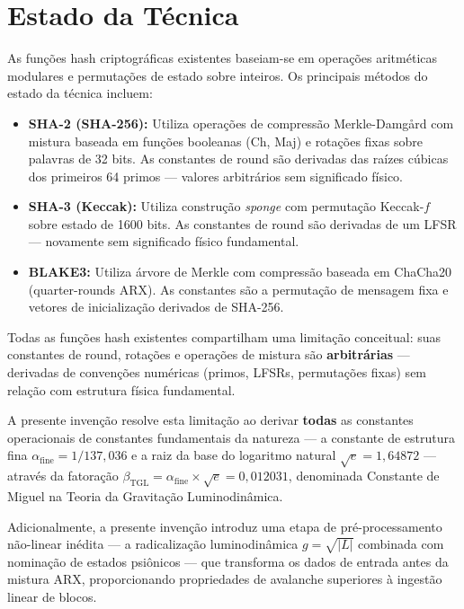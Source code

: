 \documentclass[12pt,a4paper]{article}
\newcommand{\betatgl}{\beta_{\!\scriptscriptstyle\mathrm{TGL}}}
\newcommand{\afine}{\alpha_{\mathrm{fine}}}
\begin{document}
\section{Estado da Técnica}

As funções hash criptográficas existentes baseiam-se em operações aritméticas modulares e permutações de estado sobre inteiros. Os principais métodos do estado da técnica incluem:

\begin{itemize}[nosep]
\item \textbf{SHA-2 (SHA-256):} Utiliza operações de compressão Merkle-Damgård com mistura baseada em funções booleanas (Ch, Maj) e rotações fixas sobre palavras de 32 bits. As constantes de round são derivadas das raízes cúbicas dos primeiros 64 primos --- valores arbitrários sem significado físico.

\item \textbf{SHA-3 (Keccak):} Utiliza construção \textit{sponge} com permutação Keccak-$f$ sobre estado de 1600 bits. As constantes de round são derivadas de um LFSR --- novamente sem significado físico fundamental.

\item \textbf{BLAKE3:} Utiliza árvore de Merkle com compressão baseada em ChaCha20 (quarter-rounds ARX). As constantes são a permutação de mensagem fixa e vetores de inicialização derivados de SHA-256.
\end{itemize}

Todas as funções hash existentes compartilham uma limitação conceitual: suas constantes de round, rotações e operações de mistura são \textbf{arbitrárias} --- derivadas de convenções numéricas (primos, LFSRs, permutações fixas) sem relação com estrutura física fundamental.

A presente invenção resolve esta limitação ao derivar \textbf{todas} as constantes operacionais de constantes fundamentais da natureza --- a constante de estrutura fina $\afine = 1/137{,}036$ e a raiz da base do logaritmo natural $\sqrt{e} = 1{,}64872$ --- através da fatoração $\betatgl = \afine \times \sqrt{e} = 0{,}012031$, denominada Constante de Miguel na Teoria da Gravitação Luminodinâmica.

Adicionalmente, a presente invenção introduz uma etapa de pré-processamento não-linear inédita --- a radicalização luminodinâmica $g = \sqrt{|L|}$ combinada com nominação de estados psiônicos --- que transforma os dados de entrada antes da mistura ARX, proporcionando propriedades de avalanche superiores à ingestão linear de blocos.
\end{document}
